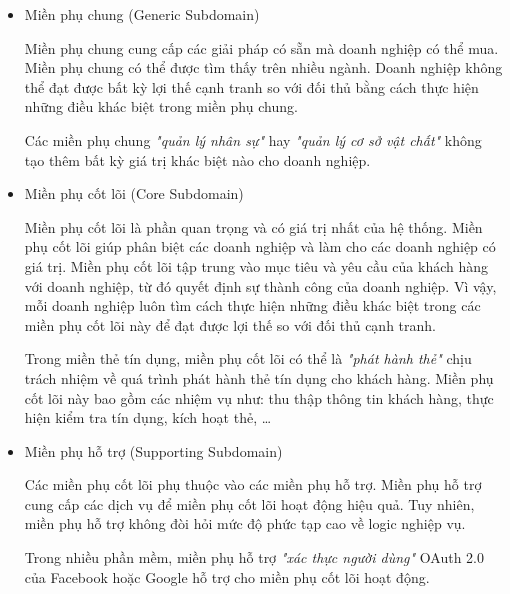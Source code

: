\begin{itemize}

\item Miền phụ chung (Generic Subdomain)

Miền phụ chung cung cấp các giải pháp có sẵn mà doanh nghiệp có thể mua. Miền phụ chung có thể được tìm thấy trên nhiều ngành. Doanh nghiệp không thể đạt được bất kỳ lợi thế cạnh tranh so với đối thủ bằng cách thực hiện những điều khác biệt trong miền phụ chung.

\begin{example} Các miền phụ chung \emph{"quản lý nhân sự"} hay \emph{"quản lý cơ sở vật chất"} không tạo thêm bất kỳ giá trị khác biệt nào cho doanh nghiệp. \end{example}

\item Miền phụ cốt lõi (Core Subdomain)

Miền phụ cốt lõi là phần quan trọng và có giá trị nhất của hệ thống. Miền phụ cốt lõi giúp phân biệt các doanh nghiệp và làm cho các doanh nghiệp có giá trị. Miền phụ cốt lõi tập trung vào mục tiêu và yêu cầu của khách hàng với doanh nghiệp, từ đó quyết định sự thành công của doanh nghiệp. Vì vậy, mỗi doanh nghiệp luôn tìm cách thực hiện những điều khác biệt trong các miền phụ cốt lõi này để đạt được lợi thế so với đối thủ cạnh tranh.

\begin{example} Trong miền thẻ tín dụng, miền phụ cốt lõi có thể là \emph{"phát hành thẻ"} chịu trách nhiệm về quá trình phát hành thẻ tín dụng cho khách hàng. Miền phụ cốt lõi này bao gồm các nhiệm vụ như: thu thập thông tin khách hàng, thực hiện kiểm tra tín dụng, kích hoạt thẻ, \dots \end{example}

\item Miền phụ hỗ trợ (Supporting Subdomain)

Các miền phụ cốt lõi phụ thuộc vào các miền phụ hỗ trợ. Miền phụ hỗ trợ cung cấp các dịch vụ để miền phụ cốt lõi hoạt động hiệu quả. Tuy nhiên, miền phụ hỗ trợ không đòi hỏi mức độ phức tạp cao về logic nghiệp vụ.

\begin{example} Trong nhiều phần mềm, miền phụ hỗ trợ \emph{"xác thực người dùng"} OAuth 2.0 của Facebook hoặc Google hỗ trợ cho miền phụ cốt lõi hoạt động. \end{example}

\end{itemize}

